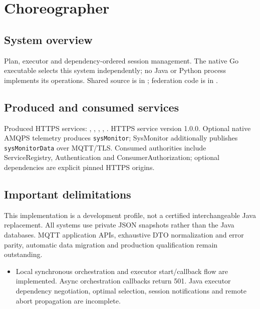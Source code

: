 \documentclass[a4paper]{arrowhead}
\begin{document}
\ArrowheadSetup
\section{Choreographer}
\subsection{System overview}
Plan, executor and dependency-ordered session management. The native Go executable selects this system independently; no Java or Python process implements its operations. Shared source is in ; federation code is in .
\subsection{Produced and consumed services}
Produced HTTPS services: , \allowbreak {}, \allowbreak {}, \allowbreak {}, \allowbreak {}.
HTTPS service version 1.0.0. Optional native AMQPS telemetry produces \texttt{sysMonitor}; SysMonitor additionally publishes \texttt{sysMonitorData} over MQTT/TLS. Consumed authorities include ServiceRegistry, Authentication and ConsumerAuthorization; optional dependencies are explicit pinned HTTPS origins.
\subsection{Important delimitations}
This implementation is a development profile, not a certified interchangeable Java replacement. All systems use private JSON snapshots rather than the Java databases. MQTT application APIs, exhaustive DTO normalization and error parity, automatic data migration and production qualification remain outstanding.
\begin{itemize}
\item Local synchronous orchestration and executor start/callback flow are implemented. Async orchestration callbacks return 501. Java executor dependency negotiation, optimal selection, session notifications and remote abort propagation are incomplete.
\end{itemize}
\end{document}
